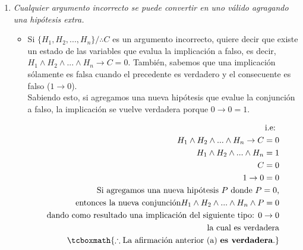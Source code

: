 \documentclass[11pt,letterpaper]{article}
\begin{document}
\begin{enumerate}
\begin{enumerate}
                \item \textit{Cualquier argumento incorrecto se puede convertir en uno válido agragando
                una hipótesis extra.}

                    \begin{itemize}
                        \item Si $\{H_1,H_2,...,H_n\}/\therefore C$ es un argumento incorrecto, quiere
                        decir que existe un estado de las variables que evalua la implicación a falso,
                        es decir, $H_1 \land H_2 \land ... \land H_n \rightarrow C = 0$. También, sabemos
                        que una implicación sólamente es falsa cuando el precedente es verdadero y el
                        consecuente es falso ($1 \rightarrow 0$). \\ Sabiendo esto, si agregamos una nueva
                        hipótesis que evalue la conjunción a falso, la implicación se vuelve verdadera
                        porque $ 0 \rightarrow 0 = 1$.

                        \begin{equation*} \begin{split}
                            \text{i.e: } \\
                            H_1 \land H_2 \land ... \land H_n \rightarrow C = 0 \\
                            H_1 \land H_2 \land ... \land H_n = 1 \\
                            C = 0 \\
                            1 \rightarrow 0  = 0 \\
                            \text{Si agregamos una nueva hipótesis } P \text{ donde $P = 0$,} \\
                            \text{entonces la nueva conjunción} H_1 \land H_2 \land ... \land H_n \land P = 0 \\
                            \text{dando como resultado una implicación del siguiente tipo: } 0 \rightarrow 0 \\
                            \text{la cual es verdadera} \\
                            \tcboxmath{\therefore \text{La afirmación anterior (a) \textbf{es verdadera}.}}
                        \end{split} \end{equation*}
                    \end{itemize}

            \end{enumerate}
\end{enumerate}
\end{document}
